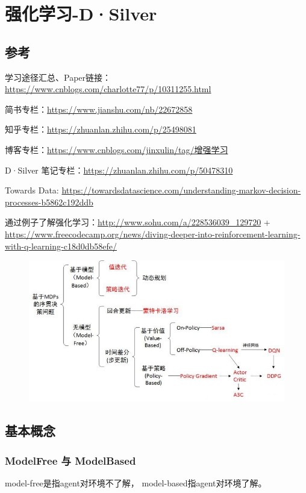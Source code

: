 \documentclass[UTF8,a4paper,12pt]{ctexbook}
\begin{document}
\chapter{强化学习-D·Silver}
	\section{参考}
		学习途径汇总、Paper链接：\url{https://www.cnblogs.com/charlotte77/p/10311255.html}
	
		简书专栏：\url{https://www.jianshu.com/nb/22672858}
	
		知乎专栏：\url{https://zhuanlan.zhihu.com/p/25498081}
		
		博客专栏：\url{https://www.cnblogs.com/jinxulin/tag/增强学习}
		
		D·Silver 笔记专栏：\url{https://zhuanlan.zhihu.com/p/50478310}
		
		Towards Data: \url{https://towardsdatascience.com/understanding-markov-decision-processes-b5862c192ddb}
		
		通过例子了解强化学习：\url{http://www.sohu.com/a/228536039_129720} + \\ \url{https://www.freecodecamp.org/news/diving-deeper-into-reinforcement-learning-with-q-learning-c18d0db58efe/}
		
		\begin{figure}[H]
			\centering
			\includegraphics[width=.9\linewidth]{MDPs}
		\end{figure}
		
		
	\section{基本概念}
		\subsection{ModelFree 与 ModelBased}
			model-free是指agent对环境不了解， model-based指agent对环境了解。
				
\end{document}
